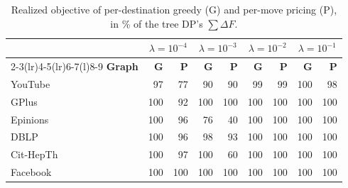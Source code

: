 \begin{table}[t]
\centering
\caption{Realized objective of per-destination greedy (G) and per-move pricing (P), in \% of the tree DP's $\sum\Delta F$.}
\label{tab:sel-objective}
\begin{tabular*}{\linewidth}{@{\extracolsep{\fill}}lrrrrrrrr@{}}
\toprule
 & \multicolumn{2}{c}{$\lambda=10^{-4}$} & \multicolumn{2}{c}{$\lambda=10^{-3}$} & \multicolumn{2}{c}{$\lambda=10^{-2}$} & \multicolumn{2}{c}{$\lambda=10^{-1}$} \\
\cmidrule(lr){2-3}\cmidrule(lr){4-5}\cmidrule(lr){6-7}\cmidrule(l){8-9}
\textbf{Graph} & \textbf{G} & \textbf{P} & \textbf{G} & \textbf{P} & \textbf{G} & \textbf{P} & \textbf{G} & \textbf{P} \\
\midrule
YouTube & 97 & 77 & 90 & 90 & 99 & 99 & 100 & 98 \\
GPlus & 100 & 92 & 100 & 100 & 100 & 100 & 100 & 100 \\
Epinions & 100 & 96 & 76 & 40 & 100 & 100 & 100 & 100 \\
DBLP & 100 & 96 & 98 & 93 & 100 & 100 & 100 & 100 \\
Cit-HepTh & 100 & 97 & 100 & 60 & 100 & 100 & 100 & 100 \\
Facebook & 100 & 100 & 100 & 100 & 100 & 100 & 100 & 100 \\
\bottomrule
\end{tabular*}
\end{table}
